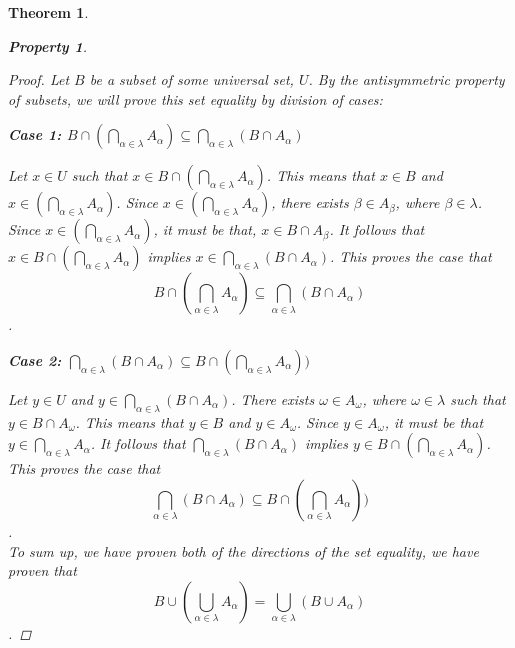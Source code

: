 \documentclass{book}
\newtheorem{theorem}{Theorem}[section]
\newtheorem{property}{Property}[theorem]
\theoremstyle{definition}
\theoremstyle{remark}
\begin{document}
\begin{theorem}
\begin{property}
        \begin{proof}
            Let $B$ be a subset of some universal set, $U$. By the antisymmetric property of subsets, we will prove this set equality by division of cases: \\
            
            \begin{flushleft} \textbf{Case 1: $B \cap \left ( \bigcap_{\alpha \in \lambda}{A_{\alpha}} \right ) \subseteq \bigcap_{\alpha \in \lambda}{(B \cap A_{\alpha})}$} \end{flushleft}
                Let $x \in U$ such that $x \in B \cap \left ( \bigcap_{\alpha \in \lambda}{A_{\alpha}} \right )$. This means that $x \in B$ and $x \in \left ( \bigcap_{\alpha \in \lambda}{A_{\alpha}} \right )$. Since $x \in \left ( \bigcap_{\alpha \in \lambda}{A_{\alpha}} \right )$, there exists $\beta \in A_{\beta}$, where $\beta \in \lambda$. Since $x \in \left ( \bigcap_{\alpha \in \lambda}{A_{\alpha}} \right )$, it must be that, $x \in B \cap A_{\beta}$. It follows that $x \in B \cap \left ( \bigcap_{\alpha \in \lambda}{A_{\alpha}} \right )$ implies $x \in \bigcap_{\alpha \in \lambda}{(B \cap A_{\alpha})}$. This proves the case that $$B \cap \left ( \bigcap_{\alpha \in \lambda}{A_{\alpha}} \right ) \subseteq \bigcap_{\alpha \in \lambda}{(B \cap A_{\alpha})}$$. \\
                
            \begin{flushleft} \textbf{Case 2: $\bigcap_{\alpha \in \lambda}{(B \cap A_{\alpha})} \subseteq B \cap \left ( \bigcap_{\alpha \in \lambda}{A_{\alpha}} \right ) )$} \end{flushleft} 
                Let $y \in U$ and $y \in \bigcap_{\alpha \in \lambda}{(B \cap A_{\alpha})}$. There exists $\omega \in A_{\omega}$, where $\omega \in \lambda$ such that $y \in B \cap A_{\omega}$. This means that $y \in B$ and $y \in A_{\omega}$. Since $y \in A_{\omega}$, it must be that $y \in \bigcap_{\alpha \in \lambda}{A_{\alpha}}$. It follows that $\bigcap_{\alpha \in \lambda}{(B \cap A_{\alpha})}$ implies $y \in B \cap \left ( \bigcap_{\alpha \in \lambda}{A_{\alpha}} \right )$. This proves the case that $$\bigcap_{\alpha \in \lambda}{(B \cap A_{\alpha})} \subseteq B \cap \left ( \bigcap_{\alpha \in \lambda}{A_{\alpha}} \right ) )$$. \\
                
            To sum up, we have proven both of the directions of the set equality, we have proven that $$B \cup \left ( \bigcup_{\alpha \in \lambda}{A_{\alpha}} \right ) = \bigcup_{\alpha \in \lambda}{(B \cup A_{\alpha})}$$. 
        \end{proof}
    \end{property}
    

\end{theorem}
\end{document}
